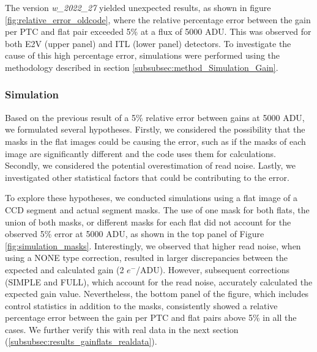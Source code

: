 The version \textit{w\_2022\_27} yielded unexpected results, as shown in figure \ref{fig:relative_error_oldcode}, where the relative percentage error between the gain per PTC and flat pair exceeded 5\% at a flux of 5000 ADU. This was observed for both E2V (upper panel) and ITL (lower panel) detectors. To investigate the cause of this high percentage error, simulations were performed using the methodology described in section \ref{subsubsec:method_Simulation_Gain}.


\subsubsection{Simulation}
Based on the previous result of a 5\% relative error between gains at 5000 ADU, we formulated several hypotheses. Firstly, we considered the possibility that the masks in the flat images could be causing the error, such as if the masks of each image are significantly different and the code uses them for calculations. Secondly, we considered the potential overestimation of read noise. Lastly, we investigated other statistical factors that could be contributing to the error.

\vspace{3mm}
To explore these hypotheses, we conducted simulations using a flat image of a CCD segment and actual segment masks. The use of one mask for both flats, the union of both masks, or different masks for each flat did not account for the observed 5\% error at 5000 ADU, as shown in the top panel of Figure \ref{fig:simulation_masks}. Interestingly, we observed that higher read noise, when using a NONE type correction, resulted in larger discrepancies between the expected and calculated gain (2 $e^-$/ADU). However, subsequent corrections (SIMPLE and FULL), which account for the read noise, accurately calculated the expected gain value. Nevertheless, the bottom panel of the figure, which includes control statistics in addition to the masks, consistently showed a relative percentage error between the gain per PTC and flat pairs above 5\% in all the cases. We further verify this with real data in the next section (\ref{subsubsec:results_gainflats_realdata}).


